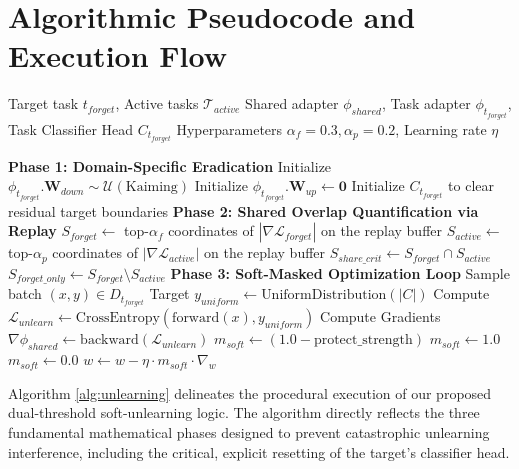 \documentclass[conference]{IEEEtran}
\theoremstyle{plain}
\theoremstyle{definition}
\theoremstyle{remark}
\begin{document}
\section{Algorithmic Pseudocode and Execution Flow}
\begin{algorithm}[h]
\caption{Three-Phase Soft-Masked Unlearning Execution}
\label{alg:unlearning}
\begin{algorithmic}[1]
\REQUIRE Target task \(t_{forget}\), Active tasks \(\mathcal{T}_{active}\)
\REQUIRE Shared adapter \(\phi_{shared}\), Task adapter \(\phi_{t_{forget}}\), Task Classifier Head \(C_{t_{forget}}\)
\REQUIRE Hyperparameters \(\alpha_f = 0.3, \alpha_p = 0.2\), Learning rate \(\eta\)

\STATE \textbf{Phase 1: Domain-Specific Eradication}
\STATE Initialize \(\phi_{t_{forget}}.\mathbf{W}_{down} \sim \mathcal{U}(\text{Kaiming})\)
\STATE Initialize \(\phi_{t_{forget}}.\mathbf{W}_{up} \leftarrow \mathbf{0}\)
\STATE Initialize \(C_{t_{forget}}\) to clear residual target boundaries 
\vspace{1.5mm}
\STATE \textbf{Phase 2: Shared Overlap Quantification via Replay}
\STATE \(S_{forget} \leftarrow\) top-\(\alpha_f\) coordinates of \(|\nabla \mathcal{L}_{forget}|\) on the replay buffer
\STATE \(S_{active} \leftarrow\) top-\(\alpha_p\) coordinates of \(|\nabla \mathcal{L}_{active}|\) on the replay buffer
\STATE \(S_{share\_crit} \leftarrow S_{forget} \cap S_{active}\) 
\STATE \(S_{forget\_only} \leftarrow S_{forget} \setminus S_{active}\) 
\vspace{1.5mm}
\STATE \textbf{Phase 3: Soft-Masked Optimization Loop}
    \STATE Sample batch \((x, y) \in D_{t_{forget}}\)
    \STATE Target \(y_{uniform} \leftarrow \text{UniformDistribution}(|C|)\)
    \STATE Compute \(\mathcal{L}_{unlearn} \leftarrow \text{CrossEntropy}(\text{forward}(x), y_{uniform})\)
    \STATE Compute Gradients \(\nabla \phi_{shared} \leftarrow \text{backward}(\mathcal{L}_{unlearn})\)
            \STATE \(m_{soft} \leftarrow (1.0 - \text{protect\_strength})\) 
            \STATE \(m_{soft} \leftarrow 1.0\) 
        \ELSE
            \STATE \(m_{soft} \leftarrow 0.0\) 
        \ENDIF
        \STATE \(w \leftarrow w - \eta \cdot m_{soft} \cdot \nabla_{w}\)
    \ENDFOR
\ENDFOR
\end{algorithmic}
\end{algorithm}
Algorithm \ref{alg:unlearning} delineates the procedural execution of our proposed dual-threshold soft-unlearning logic. The algorithm directly reflects the three fundamental mathematical phases designed to prevent catastrophic unlearning interference, including the critical, explicit resetting of the target's classifier head.
\end{document}
